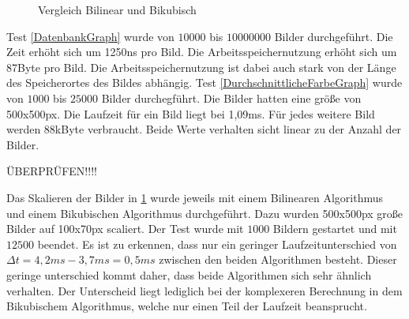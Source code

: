 \begin{figure}[h]
{
        \label{SkalierenGraph}
    }
    
    \caption[BilinearBikubisch]{Vergleich Bilinear und Bikubisch}
\end{figure}
Test \ref{DatenbankGraph} wurde von $10000$ bis $10000000$ Bilder durchgeführt. Die Zeit erhöht sich um 1250ns pro Bild. Die Arbeitsspeichernutzung erhöht sich um 87Byte pro Bild. Die Arbeitsspeichernutzung ist dabei auch stark von der Länge des Speicherortes des Bildes abhängig.
\newline
Test \ref{DurchschnittlicheFarbeGraph} wurde von $1000$ bis $25000$ Bilder durchegführt. Die Bilder hatten eine größe von 500x500px. Die Laufzeit für ein Bild liegt bei 1,09ms. Für jedes weitere Bild werden 88kByte verbraucht. Beide Werte verhalten sicht linear zu der Anzahl der Bilder.
\newline

ÜBERPRÜFEN!!!!

Das Skalieren der Bilder in \ref{SkalierenGraph} wurde jeweils mit einem Bilinearen Algorithmus und einem Bikubischen Algorithmus durchgeführt. Dazu wurden 500x500px große Bilder auf 100x70px scaliert. Der Test wurde mit $1000$ Bildern gestartet und mit $12500$ beendet. Es ist zu erkennen, dass nur ein geringer Laufzeitunterschied von $\Delta t = 4,2ms - 3,7ms = 0,5ms$ zwischen den beiden Algorithmen besteht. Dieser geringe unterschied kommt daher, dass beide Algorithmen sich sehr ähnlich verhalten. Der Unterscheid liegt lediglich bei der komplexeren Berechnung in dem Bikubischem Algorithmus, welche nur einen Teil der Laufzeit beansprucht.